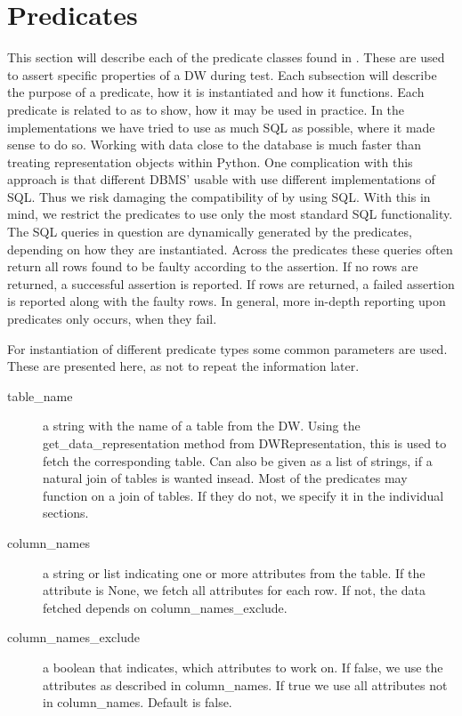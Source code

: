 \section{Predicates}\label{sect:pred}
This section will describe each of the predicate classes found in \FW. These are used to assert specific properties of a DW during test. Each subsection will describe the purpose of a predicate, how it is instantiated and how it functions. Each predicate is related to  as to show, how it may be used in practice. In the implementations we have tried to use as much SQL as possible, where it made sense to do so. Working with data close to the database is much faster than treating representation objects within Python. One complication with this approach is that different DBMS' usable
with \FW{} use different implementations of SQL. Thus we risk damaging the compatibility of \FW{} by using SQL. With this in mind, we restrict the predicates to use only the most standard SQL functionality. The SQL queries in question are dynamically generated by the predicates, depending on how they are instantiated. Across the predicates these queries often return all rows found to be faulty according to the assertion. If no rows are returned, a successful assertion is reported. If rows are returned, a failed assertion is reported along with the faulty rows. In general, more in-depth reporting upon predicates only occurs, when they fail.   

For instantiation of different predicate types some common parameters are used. These are presented here, as not to repeat the information later.
\begin{description}
\item [table\_name] a string with the name of a table from the DW. Using the get\_data\_representation method from DWRepresentation, this is used to fetch the corresponding table. Can also be given as a list of strings, if a natural join of tables is wanted insead. Most of the predicates may function on a join of tables. If they do not, we specify it in the individual sections.
\item [column\_names] a string or list indicating one or more attributes from the table. If the attribute is None, we fetch all attributes for each row. If not, the data fetched depends on column\_names\_exclude.
\item [column\_names\_exclude] a boolean that indicates, which attributes to work on. If false, we use the attributes as described in column\_names. If true we use all attributes not in column\_names. Default is false. 
\end{description}














